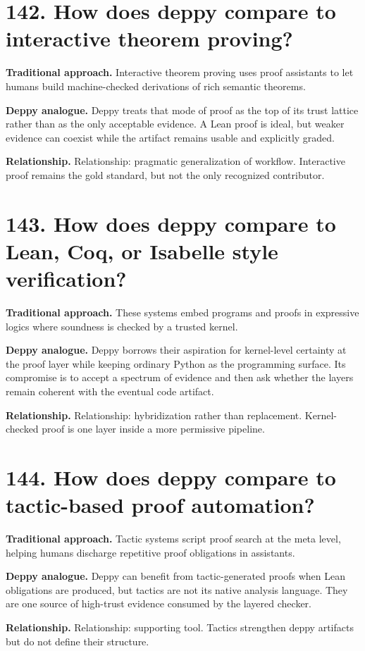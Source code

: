 \documentclass[11pt,openany]{book}
\begin{document}
\section*{142. How does deppy compare to interactive theorem proving?}
\textbf{Traditional approach.} Interactive theorem proving uses proof assistants to let humans build machine-checked derivations of rich semantic theorems.

\textbf{Deppy analogue.} Deppy treats that mode of proof as the top of its trust lattice rather than as the only acceptable evidence. A Lean proof is ideal, but weaker evidence can coexist while the artifact remains usable and explicitly graded.

\textbf{Relationship.} Relationship: pragmatic generalization of workflow. Interactive proof remains the gold standard, but not the only recognized contributor.

\section*{143. How does deppy compare to Lean, Coq, or Isabelle style verification?}
\textbf{Traditional approach.} These systems embed programs and proofs in expressive logics where soundness is checked by a trusted kernel.

\textbf{Deppy analogue.} Deppy borrows their aspiration for kernel-level certainty at the proof layer while keeping ordinary Python as the programming surface. Its compromise is to accept a spectrum of evidence and then ask whether the layers remain coherent with the eventual code artifact.

\textbf{Relationship.} Relationship: hybridization rather than replacement. Kernel-checked proof is one layer inside a more permissive pipeline.

\section*{144. How does deppy compare to tactic-based proof automation?}
\textbf{Traditional approach.} Tactic systems script proof search at the meta level, helping humans discharge repetitive proof obligations in assistants.

\textbf{Deppy analogue.} Deppy can benefit from tactic-generated proofs when Lean obligations are produced, but tactics are not its native analysis language. They are one source of high-trust evidence consumed by the layered checker.

\textbf{Relationship.} Relationship: supporting tool. Tactics strengthen deppy artifacts but do not define their structure.
\end{document}
